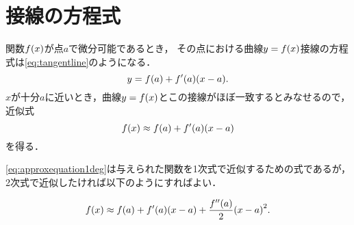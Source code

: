 \documentclass{ltjsarticle}
\newcommand{\paren}[1]{\mleft ( #1 \mright )} %
\newcommand{\apply}[2]{#1 \paren{#2}} %
\newcommand{\derivprime}[1]{#1 ^{\prime}}
\newcommand{\derivprimetwo}[1]{#1 ^{\prime \prime}}
\begin{document}
%
\section{接線の方程式}
\label{sec:tangentline}

関数$\apply{f}{x}$が点$a$で微分可能であるとき，
その点における曲線$y = \apply{f}{x}$接線の方程式は\cref{eq:tangentline}のようになる．
\begin{equation}
  y = \apply{f}{a} + \apply{\derivprime{f}}{a} \paren{x - a} .
  \label{eq:tangentline}
\end{equation}
$x$が十分$a$に近いとき，曲線$y = \apply{f}{x}$とこの接線がほぼ一致するとみなせるので，
近似式
\begin{equation}
  \apply{f}{x} \approx \apply{f}{a} + \apply{\derivprime{f}}{a} \paren{x - a}
  \label{eq:approxequation1deg}
\end{equation}
を得る．

\cref{eq:approxequation1deg}は与えられた関数を1次式で近似するための式であるが，
2次式で近似したければ以下のようにすればよい．

\begin{equation}
  \apply{f}{x} \approx \apply{f}{a} + \apply{\derivprime{f}}{a} \paren{x - a} 
  + \frac{\apply{\derivprimetwo{f}}{a}}{2} \paren{x - a}^2.
  \label{eq:approxequation2deg}
\end{equation}
\end{document}
